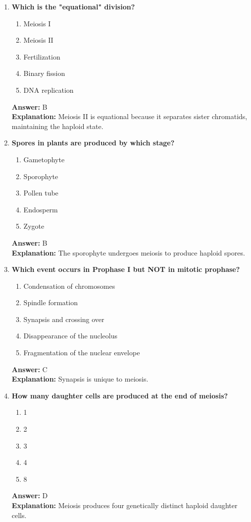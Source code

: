 \documentclass[11pt, a4paper]{article}
\begin{document}
\begin{enumerate}[leftmargin=*, label=\arabic*.]
\item \textbf{Which is the "equational" division?}
\begin{enumerate}[label=\Alph*.]
\item Meiosis I
\item Meiosis II
\item Fertilization
\item Binary fission
\item DNA replication
\end{enumerate}
\textbf{Answer:} B \\
\textbf{Explanation:} Meiosis II is equational because it separates sister chromatids, maintaining the haploid state.

\item \textbf{Spores in plants are produced by which stage?}
\begin{enumerate}[label=\Alph*.]
\item Gametophyte
\item Sporophyte
\item Pollen tube
\item Endosperm
\item Zygote
\end{enumerate}
\textbf{Answer:} B \\
\textbf{Explanation:} The sporophyte undergoes meiosis to produce haploid spores.

\item \textbf{Which event occurs in Prophase I but NOT in mitotic prophase?}
\begin{enumerate}[label=\Alph*.]
\item Condensation of chromosomes
\item Spindle formation
\item Synapsis and crossing over
\item Disappearance of the nucleolus
\item Fragmentation of the nuclear envelope
\end{enumerate}
\textbf{Answer:} C \\
\textbf{Explanation:} Synapsis is unique to meiosis.

\item \textbf{How many daughter cells are produced at the end of meiosis?}
\begin{enumerate}[label=\Alph*.]
\item 1
\item 2
\item 3
\item 4
\item 8
\end{enumerate}
\textbf{Answer:} D \\
\textbf{Explanation:} Meiosis produces four genetically distinct haploid daughter cells.


\end{enumerate}
\end{document}
